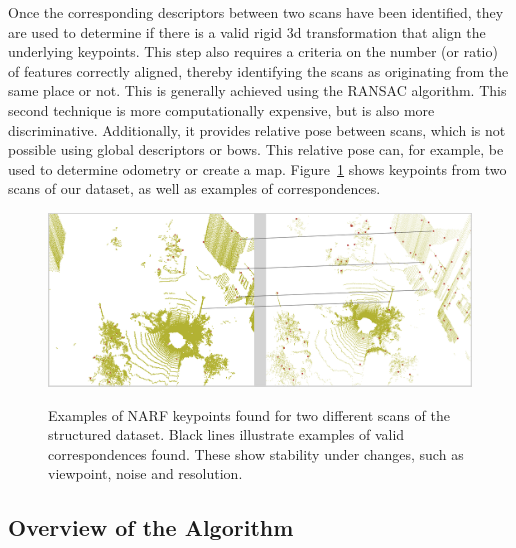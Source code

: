 Once the corresponding descriptors between two scans have been identified, they are used to determine if there is a valid rigid \gls*{3d} transformation that align the underlying keypoints. This step also requires a criteria on the number (or ratio) of features correctly aligned, thereby identifying the scans as originating from the same place or not. This is generally achieved using the RANSAC algorithm. This second technique is more computationally expensive, but is also more discriminative. Additionally, it provides relative pose between scans, which is not possible using global descriptors or \gls*{bow}s. This relative pose can, for example, be used to determine odometry or create a map. Figure~\ref{fig:chap_slam_features_correspondences} shows keypoints from two scans of our dataset, as well as examples of correspondences.

\begin{figure}[H]
    \centering
    \includegraphics[width=0.995\linewidth]{img/chap_slam/features_line.png}\\
    \caption{Examples of NARF keypoints found for two different scans of the structured dataset. Black lines illustrate examples of valid correspondences found. These show stability under changes, such as viewpoint, noise and resolution.}
    \label{fig:chap_slam_features_correspondences}
\end{figure}


\subsection{Overview of the Algorithm}
\label{ssec:chap_slam_algo}

